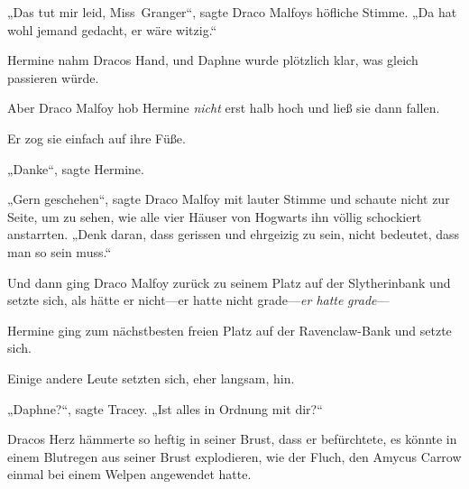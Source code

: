 „Das tut mir leid, Miss~Granger“, sagte Draco Malfoys höfliche Stimme. „Da hat wohl jemand gedacht, er wäre witzig.“

Hermine nahm Dracos Hand, und Daphne wurde plötzlich klar, was gleich passieren würde.

Aber Draco Malfoy hob Hermine \emph{nicht} erst halb hoch und ließ sie dann fallen.

Er zog sie einfach auf ihre Füße.

„Danke“, sagte Hermine.

„Gern geschehen“, sagte Draco Malfoy mit lauter Stimme und schaute nicht zur Seite, um zu sehen, wie alle vier Häuser von Hogwarts ihn völlig schockiert anstarrten. „Denk daran, dass gerissen und ehrgeizig zu sein, nicht bedeutet, dass man so sein muss.“

Und dann ging Draco Malfoy zurück zu seinem Platz auf der Slytherinbank und setzte sich, als hätte er nicht—er hatte nicht grade—\emph{er hatte} \emph{grade}—

Hermine ging zum nächstbesten freien Platz auf der Ravenclaw-Bank und setzte sich.

Einige andere Leute setzten sich, eher langsam, hin.

„Daphne?“, sagte Tracey. „Ist alles in Ordnung mit dir?“

\later

Dracos Herz hämmerte so heftig in seiner Brust, dass er befürchtete, es könnte in einem Blutregen aus seiner Brust explodieren, wie der Fluch, den Amycus Carrow einmal bei einem Welpen angewendet hatte.


